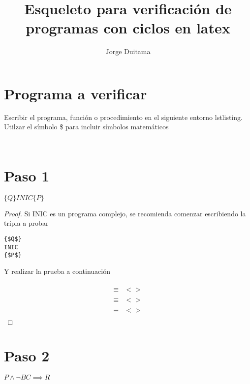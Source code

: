 \documentclass[]{article}
\begin{document}
	
	
\title{Esqueleto para verificación de programas con ciclos en latex}
	
\author{Jorge Duitama}
	
\maketitle

\section*{Programa a verificar}

Escribir el programa, función o procedimiento en el siguiente entorno lstlisting.
Utilzar el símbolo \$ para incluir símbolos matemáticos

\begin{lstlisting}[language=GCL, mathescape, tabsize=4]


\end{lstlisting}

\section*{Paso 1}
$\{Q\}INIC\{P\}$

\begin{proof}

Si INIC es un programa complejo, se recomienda comenzar escribiendo la tripla a probar

\begin{lstlisting}[language=GCL, mathescape, tabsize=4]
{$Q$}
INIC
{$P$}
\end{lstlisting}

Y realizar la prueba a continuación

\begin{align*}
 & \\
\equiv &<\text{}> \\
 & \\
\equiv &<\text{}> \\
 & \\
\equiv &<\text{}> \\
 & 
\end{align*}
\end{proof}

\section*{Paso 2}
$P \wedge \neg BC \implies R$
\end{document}
